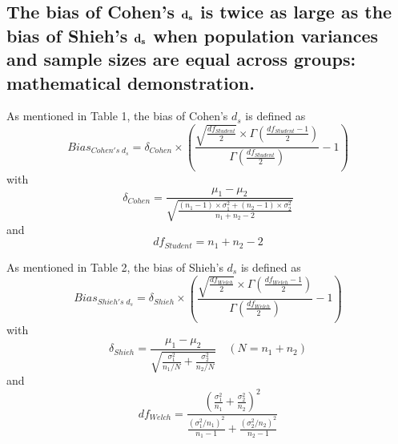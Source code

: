 \documentclass[
  english,
  man,floatsintext]{apa6}
\begin{document}
\begin{appendix}
\section{}
\hypertarget{the-bias-of-cohens-bf-d_s-is-twice-as-large-as-the-bias-of-shiehs-bf-d_s-when-population-variances-and-sample-sizes-are-equal-across-groups-mathematical-demonstration.}{%
\subsection{\texorpdfstring{The bias of Cohen's \(\bf d_s\) is twice as
large as the bias of Shieh's \(\bf d_s\) when population variances and
sample sizes are equal across groups: mathematical
demonstration.}{The bias of Cohen's \textbackslash bf d\_s is twice as large as the bias of Shieh's \textbackslash bf d\_s when population variances and sample sizes are equal across groups: mathematical demonstration.}}\label{the-bias-of-cohens-bf-d_s-is-twice-as-large-as-the-bias-of-shiehs-bf-d_s-when-population-variances-and-sample-sizes-are-equal-across-groups-mathematical-demonstration.}}

As mentioned in Table 1, the bias of Cohen's \(d_s\) is defined as
\begin{equation} 
Bias_{Cohen's \; d{_s}}= \delta_{Cohen} \times \left( \frac{\sqrt{\frac{df_{Student}}{2}} \times \Gamma{\left(\frac{df_{Student}-1}{2}\right)}}{\Gamma{\left( \frac{df_{Student}}{2}\right)}} -1 \right)
\label{eq:Cohenbias}
\end{equation} with \begin{equation*} 
\delta_{Cohen}=\frac{\mu_1-\mu_2}{\sqrt{\frac{(n_1-1)\times \sigma^2_1+(n_2-1)\times\sigma^2_2}{n_1+n_2-2}}}
\label{eq:Cohendelta}
\end{equation*} and \begin{equation*} 
df_{Student}=n_1+n_2-2
\label{eq:Cohendf}
\end{equation*}

As mentioned in Table 2, the bias of Shieh's \(d_s\) is defined as
\begin{equation} 
Bias_{Shieh's \; d{_s}}=\delta_{Shieh} \times \left( \frac{\sqrt{\frac{df_{Welch}}{2}} \times \Gamma{\left(\frac{df_{Welch}-1}{2}\right)}}{\Gamma{\left( \frac{df_{Welch}}{2}\right)}} -1 \right)
\label{eq:Shiehbias}
\end{equation} with \begin{equation*} 
\delta_{Shieh}=\frac{\mu_1-\mu_2}{\sqrt{\frac{\sigma^2_1}{n_1/N}+\frac{\sigma^2_2}{n_2/N}}} \quad (N=n_1+n_2)
\label{eq:Shiehdelta}
\end{equation*} and \begin{equation*} 
df_{Welch}=\frac{\left(\frac{\sigma^2_1}{n_1}+\frac{\sigma^2_2}{n_2} \right)^2}{\frac{(\sigma^2_1/n_1)^2}{n_1-1}+\frac{(\sigma^2_2/n_2)^2}{n_2-1}}
\label{eq:Welchdf}
\end{equation*}


\end{appendix}
\end{document}

